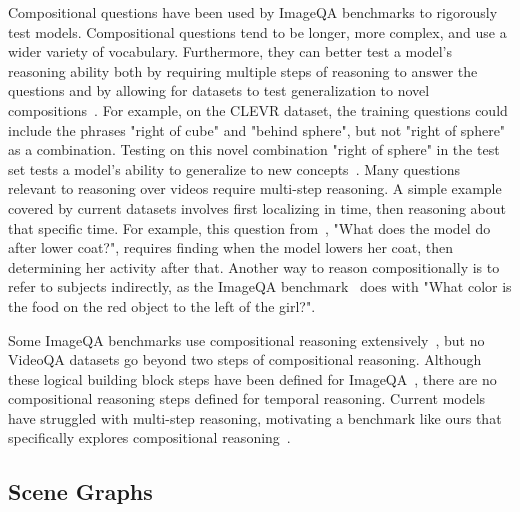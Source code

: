 \documentclass[10pt,twocolumn,letterpaper]{article}
\newcommand{\mgm}[1]{{\color{cyan}{mgm: #1}}}
\begin{document}
Compositional questions have been used by ImageQA benchmarks to rigorously test models. Compositional questions tend to be longer, more complex, and use a wider variety of vocabulary. Furthermore, they can better test a model's reasoning ability both by requiring multiple steps of reasoning to answer the questions and by allowing for datasets to test generalization to novel compositions~\cite{johnson2017clevr,hudson2019gqa,lake2018generalization}. For example, on the CLEVR dataset, the training questions could include the phrases "right of cube" and "behind sphere", but not "right of sphere" as a combination. Testing on this novel combination "right of sphere" in the test set tests a model's ability to generalize to new concepts~\cite{lake2018generalization,johnson2017clevr}. Many questions relevant to reasoning over videos require multi-step reasoning. A simple example covered by current datasets involves first localizing in time, then reasoning about that specific time. For example, this question from~\cite{jang2017tgif}, "What does the model do after
lower coat?", requires finding when the model lowers her coat, then determining her activity after that. Another way to reason compositionally is to refer to subjects indirectly, as the ImageQA benchmark~\cite{hudson2019gqa} does with "What color is the food on the red object to the left of the girl?". 

Some ImageQA benchmarks use compositional reasoning extensively~\cite{johnson2017clevr,hudson2019gqa}, but no VideoQA datasets go beyond two steps of compositional reasoning. Although these logical building block steps have been defined for ImageQA~\cite{cheng2015break}, there are no compositional reasoning steps defined for temporal reasoning. Current models have struggled with multi-step reasoning, motivating a benchmark like ours that specifically explores compositional reasoning~\cite{fan2019heterogeneous}. \mgm{Think this has the right information, though may switch back and forth between different types of things (multistep vs novel combination) so I want to be clearer in how I structure it}


\subsection{Scene Graphs}
\end{document}
